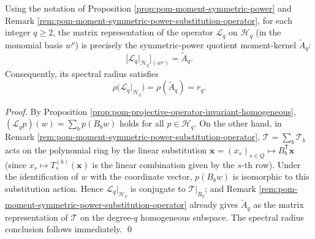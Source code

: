 \begin{theorem}[Integer degeneration = symmetric-power moment-kernel]\label{thm:pom-projective-operator-degenerates-to-moment-kernel}
Using the notation of Proposition \ref{prop:pom-moment-symmetric-power} and Remark \ref{rem:pom-moment-symmetric-power-substitution-operator}, for each integer \(q\ge 2\), the matrix representation of the operator \(\mathcal{L}_q\) on \(\mathcal{H}_q\) (in the monomial basis \(w^\nu\)) is precisely the symmetric-power quotient moment-kernel \(\widetilde A_q\):
\[
\bigl[\mathcal{L}_q|_{\mathcal{H}_q}\bigr]_{(w^\nu)}=\widetilde A_q.
\]
Consequently, its spectral radius satisfies
\[
\rho\!\bigl(\mathcal{L}_q|_{\mathcal{H}_q}\bigr)=\rho(\widetilde A_q)=r_q.
\]
\end{theorem}
\begin{proof}
By Proposition \ref{prop:pom-projective-operator-invariant-homogeneous},
\(
(\mathcal{L}_q p)(w)=\sum_{b} p(B_b w)
\)
holds for all \(p\in\mathcal{H}_q\). On the other hand, in Remark \ref{rem:pom-moment-symmetric-power-substitution-operator},
\(\mathcal{T}=\sum_b \mathcal{T}_b\)
acts on the polynomial ring by the linear substitution \(\mathbf{x}=(x_s)_{s\in Q}\mapsto B_b^{\mathsf T}\mathbf{x}\) (since \(x_s\mapsto T_s^{(b)}(\mathbf{x})\) is the linear combination given by the \(s\)-th row). Under the identification of \(w\) with the coordinate vector, \(p(B_b w)\) is isomorphic to this substitution action.
Hence \(\mathcal{L}_q|_{\mathcal{H}_q}\) is conjugate to \(\mathcal{T}|_{R_q}\); and Remark \ref{rem:pom-moment-symmetric-power-substitution-operator} already gives \(\widetilde A_q\) as the matrix representation of \(\mathcal{T}\) on the degree-\(q\) homogeneous subspace.
The spectral radius conclusion follows immediately. \qed
\end{proof}

